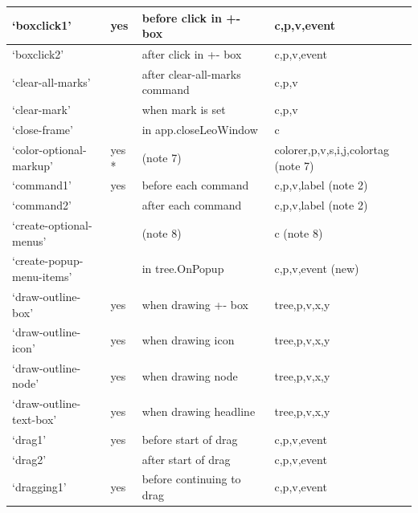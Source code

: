 \documentclass[a4paper,10pt,english]{sphinxmanual}
\begin{document}
\begin{longtable}{|l|l|l|l|}
`boxclick1'
 & 
yes
 & 
before click in +- box
 & 
c,p,v,event
\\\hline

`boxclick2'
 &  & 
after  click in +- box
 & 
c,p,v,event
\\\hline

`clear-all-marks'
 &  & 
after clear-all-marks command
 & 
c,p,v
\\\hline

`clear-mark'
 &  & 
when mark is set
 & 
c,p,v
\\\hline

`close-frame'
 &  & 
in app.closeLeoWindow
 & 
c
\\\hline

`color-optional-markup'
 & 
yes *
 & 
(note 7)
 & 
colorer,p,v,s,i,j,colortag (note 7)
\\\hline

`command1'
 & 
yes
 & 
before each command
 & 
c,p,v,label (note 2)
\\\hline

`command2'
 &  & 
after  each command
 & 
c,p,v,label (note 2)
\\\hline

`create-optional-menus'
 &  & 
(note 8)
 & 
c (note 8)
\\\hline

`create-popup-menu-items'
 &  & 
in tree.OnPopup
 & 
c,p,v,event (new)
\\\hline

`draw-outline-box'
 & 
yes
 & 
when drawing +- box
 & 
tree,p,v,x,y
\\\hline

`draw-outline-icon'
 & 
yes
 & 
when drawing icon
 & 
tree,p,v,x,y
\\\hline

`draw-outline-node'
 & 
yes
 & 
when drawing node
 & 
tree,p,v,x,y
\\\hline

`draw-outline-text-box'
 & 
yes
 & 
when drawing headline
 & 
tree,p,v,x,y
\\\hline

`drag1'
 & 
yes
 & 
before start of drag
 & 
c,p,v,event
\\\hline

`drag2'
 &  & 
after  start of drag
 & 
c,p,v,event
\\\hline

`dragging1'
 & 
yes
 & 
before continuing to drag
 & 
c,p,v,event
\\\hline


\end{longtable}
\end{document}
